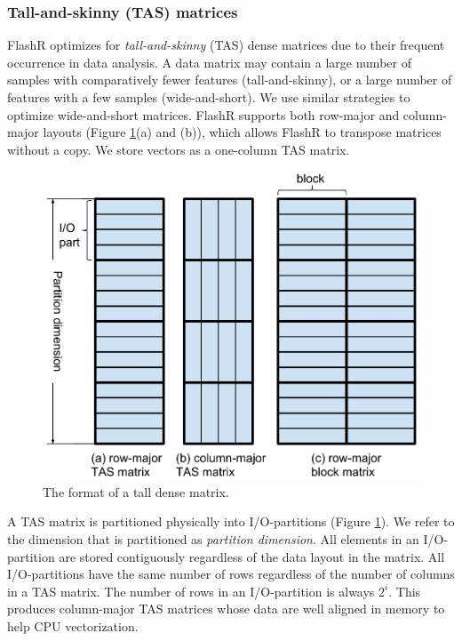 \subsubsection{Tall-and-skinny (TAS) matrices}
FlashR optimizes for \textit{tall-and-skinny} (TAS) dense matrices
due to their frequent occurrence in data analysis. A data matrix may contain
a large number of samples with comparatively fewer features (tall-and-skinny),
or a large number of features with a few samples (wide-and-short).
We use similar strategies to optimize wide-and-short matrices. FlashR
supports both row-major and column-major layouts (Figure \ref{fig:den_mat}(a)
and (b)), which allows FlashR to transpose matrices without a copy.
We store vectors as a one-column TAS matrix.

\begin{figure}
	\centering
	\includegraphics[scale=0.4]{FlashMatrix_figs/dense_matrix2.pdf}
	\caption{The format of a tall dense matrix.}
	\label{fig:den_mat}
  \vspace{-12pt}
\end{figure}

A TAS matrix is partitioned physically into I/O-partitions (Figure
\ref{fig:den_mat}). We refer to the dimension that is partitioned as
\textit{partition dimension}. All elements in an I/O-partition are stored
contiguously regardless of the data layout in the matrix. All 
I/O-partitions have the same number of rows regardless of
the number of columns in a TAS matrix. The number of rows in
an I/O-partition is always $2^i$. This produces column-major TAS
matrices whose data are well aligned in memory to help CPU vectorization.

